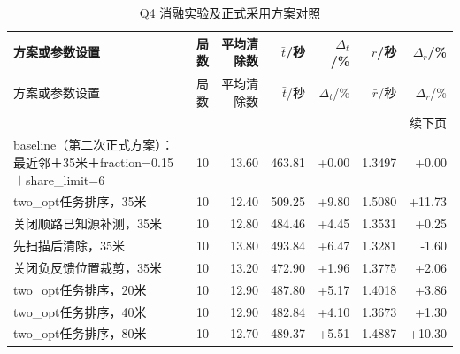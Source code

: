 \begingroup\small\setlength{\tabcolsep}{3pt}
\begin{longtable}{p{}rrrrrr}
\caption{Q4 消融实验及正式采用方案对照}\label{tab:official-q4-2}\\
\toprule
方案或参数设置 & 局数 & 平均清除数 & $\bar t$/秒 & $\Delta_t$/\% & $\bar r$/秒 & $\Delta_r$/\% \\
\midrule\endfirsthead
\toprule
方案或参数设置 & 局数 & 平均清除数 & $\bar t$/秒 & $\Delta_t$/\% & $\bar r$/秒 & $\Delta_r$/\% \\
\midrule\endhead
\midrule\multicolumn{7}{r}{续下页}\\\endfoot
\bottomrule\endlastfoot
baseline（第二次正式方案）：最近邻＋35米＋fraction=0.15＋share\_limit=6 & 10 & 13.60 & 463.81 & +0.00 & 1.3497 & +0.00 \\
two\_opt任务排序，35米 & 10 & 12.40 & 509.25 & +9.80 & 1.5080 & +11.73 \\
关闭顺路已知源补测，35米 & 10 & 12.80 & 484.46 & +4.45 & 1.3531 & +0.25 \\
先扫描后清除，35米 & 10 & 13.80 & 493.84 & +6.47 & 1.3281 & -1.60 \\
关闭负反馈位置裁剪，35米 & 10 & 13.20 & 472.90 & +1.96 & 1.3775 & +2.06 \\
two\_opt任务排序，20米 & 10 & 12.90 & 487.80 & +5.17 & 1.4018 & +3.86 \\
two\_opt任务排序，40米 & 10 & 12.90 & 482.84 & +4.10 & 1.3673 & +1.30 \\
two\_opt任务排序，80米 & 10 & 12.70 & 489.37 & +5.51 & 1.4887 & +10.30 \\
\end{longtable}\endgroup
